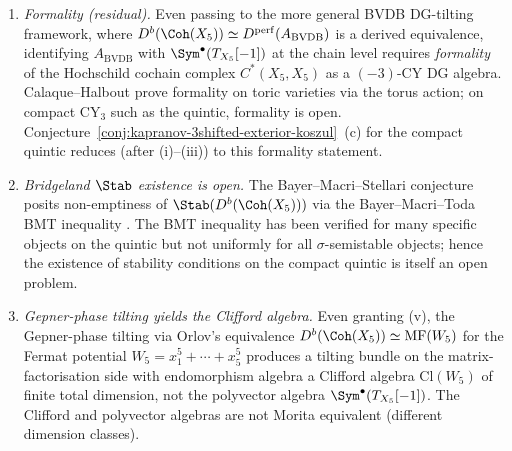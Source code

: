 \begin{theorem}
\begin{enumerate}[label=\textup{(\roman*)}]
 quintic admits a compact generator $E_{\mathrm{BVDB}} =
 \bigoplus_{i=0}^{4}\mathcal{O}_{X_5}(i)$ (Beilinson collection on
 $\P^4$ restricted to $X_5$, by \cite{BondalOrlov2001} extended through
 Bondal--Van~den~Bergh's compact-generator theorem for smooth proper
 varieties). The DG algebra
 $A_{\mathrm{BVDB}} := \End^\bullet(E_{\mathrm{BVDB}})$ has total
 cohomological dimension
 \[
 \dim A_{\mathrm{BVDB}} \;=\; \sum_{i,j=0}^{4}\sum_{q=0}^{3}
 \dim H^q(X_5, \mathcal{O}_{X_5}(j-i)) \;=\; 420,
 \]
 distributed as $210$ in degree $0$ and $210$ in degree $3$ (a
 $(-3)$-CY pairing in the Serre-symmetric sense). By contrast,
 $\Sym^\bullet(T_{X_5}[-1])$ has infinite total cohomological dimension:
 the graded piece in formal degree $p$ has rank $\binom{p+2}{2}$ and the
 induced cohomology persists for all $p$. Hence $A_{\mathrm{BVDB}}$ and
 $\Sym^\bullet(T_{X_5}[-1])$ lie in different dimension classes and
 cannot be quasi-isomorphic as DG algebras on the nose.
 \item \emph{Formality (residual).} Even passing to the more general
 BVDB DG-tilting framework, where $D^b(\Coh(X_5))\simeq D^{\mathrm{perf}}(A_{\mathrm{BVDB}})$
 is a derived equivalence, identifying $A_{\mathrm{BVDB}}$ with
 $\Sym^\bullet(T_{X_5}[-1])$ at the chain level requires \emph{formality}
 of the Hochschild cochain complex $C^*(X_5,X_5)$ as a $(-3)$-CY DG
 algebra. Calaque--Halbout \cite{CalaqueHalbout2011} prove formality on
 toric varieties via the torus action; on compact CY$_3$ such as the
 quintic, formality is open. Conjecture~\ref{conj:kapranov-3shifted-exterior-koszul}~(c)
 for the compact quintic reduces (after (i)--(iii)) to this formality
 statement.
 \item \emph{Bridgeland $\Stab$ existence is open.} The Bayer--Macri--Stellari
 conjecture posits non-emptiness of $\Stab(D^b(\Coh(X_5)))$ via the
 Bayer--Macri--Toda BMT inequality \cite{BayerMacriToda2014}. The BMT
 inequality has been verified for many specific objects on the quintic
 but not uniformly for all $\sigma$-semistable objects; hence the
 existence of stability conditions on the compact quintic is itself an
 open problem.
 \item \emph{Gepner-phase tilting yields the Clifford algebra.} Even
 granting (v), the Gepner-phase tilting via Orlov's equivalence
 $D^b(\Coh(X_5))\simeq \mathrm{MF}(W_5)$ for the Fermat potential
 $W_5 = x_1^5 + \cdots + x_5^5$ produces a tilting bundle on the
 matrix-factorisation side with endomorphism algebra a Clifford algebra
 $\mathrm{Cl}(W_5)$ of finite total dimension, not the polyvector
 algebra $\Sym^\bullet(T_{X_5}[-1])$. The Clifford and polyvector
 algebras are not Morita equivalent (different dimension classes).
\end{enumerate}
\end{theorem}

